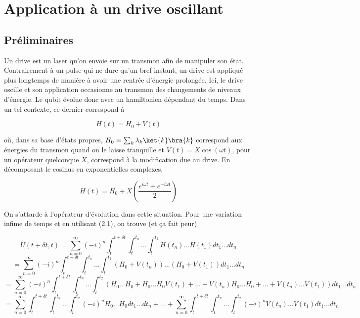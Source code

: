 \newpage
\section{Application à un drive oscillant}
\subsection{Préliminaires}
Un drive est un laser qu'on envoie sur un transmon afin de manipuler son état. Contrairement à un pulse qui ne dure qu'un bref instant, un drive est appliqué plus longtemps de manière à avoir une rentrée d'énergie prolongée. Ici, le drive oscille et son application occasionne au transmon des changements de niveaux d'énergie. Le qubit évolue donc avec un hamiltonien dépendant du temps. Dans un tel contexte, ce dernier correspond à  

\begin{equation}
    H(t) = H_0 + V(t)
\end{equation}

où, dans sa base d'états propres, $H_0 = \sum_{k} \lambda_k \ket{k}\bra{k}$ correspond aux énergies du transmon quand on le laisse tranquille et $V(t) = X\cos(\omega t)$, pour un opérateur quelconque $X$, correspond à la modification due au drive. En décomposant le cosinus en exponentielles complexes, 

\begin{equation*}
    H(t) = H_0 + X\left(\frac{e^{i \omega t} + e^{-i\omega t}}{2}\right)
\end{equation*}

On s'attarde à l'opérateur d'évolution dans cette situation. Pour une variation infime de temps et en utilisant (2.1), on trouve (et ça fait peur)

\begin{equation*}
    U(t+\delta t, t) = \sum_{n=0}^{\infty} (-i)^n \int_{t}^{t+\delta t}\int_{t}^{t_n}...\int_{t}^{t_2}H(t_n)...H(t_1)dt_1 ... dt_n
\end{equation*}
\begin{equation*}
    = \sum_{n=0}^{\infty} (-i)^n \int_{t}^{t+\delta t}\int_{t}^{t_n}...\int_{t}^{t_2}\left(H_0 + 
    V(t_n)\right)...\left(H_0 + V(t_1)\right)dt_1 ... dt_n
\end{equation*}
\begin{equation*}
    = \sum_{n=0}^{\infty} (-i)^n \int_{t}^{t+\delta t}\int_{t}^{t_n}...\int_{t}^{t_2} \left(H_0...H_0 + H_0...H_0V(t_1) + ... + V(t_n)H_0...H_0 + ... + V(t_n)...V(t_1)\right)dt_1 ... dt_n
\end{equation*}
\begin{equation}
    = \sum_{n=0}^{\infty} \int_{t}^{t+\delta t}\int_{t}^{t_n}...\int_{t}^{t_2} (-i)^n H_0...H_0 dt_1...dt_n + ... + \sum_{n=0}^{\infty} \int_{t}^{t+\delta t}\int_{t}^{t_n}...\int_{t}^{t_2}(-i)^n V(t_n)...V(t_1) dt_1...dt_n
\end{equation}


